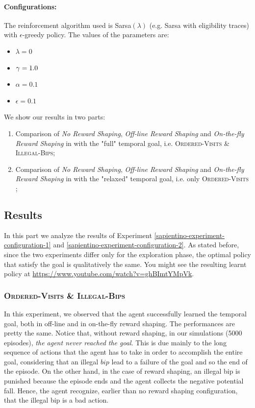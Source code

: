 \paragraph{Configurations:}
The reinforcement algorithm used is Sarsa$(\lambda)$ (e.g. Sarsa with eligibility traces) with $\epsilon$-greedy policy. The values of the parameters are:
\begin{itemize}
	\item $\lambda = 0$
	\item $\gamma=1.0$	
	\item $\alpha=0.1$
	\item $\epsilon= 0.1$
\end{itemize}

\medskip

We show our results in two parts:
\begin{enumerate}
	\item Comparison of \emph{No Reward Shaping}, \emph{Off-line Reward Shaping} and \emph{On-the-fly Reward Shaping} in \Sapientino with the "full" temporal goal, i.e. \textsc{Ordered-Visits \& Illegal-Bips}\label{sapientino-experiment-configuration-1};
	\item Comparison of \emph{No Reward Shaping}, \emph{Off-line Reward Shaping} and \emph{On-the-fly Reward Shaping} in \Sapientino with the "relaxed" temporal goal, i.e. only \textsc{Ordered-Visits} \label{sapientino-experiment-configuration-2};
\end{enumerate}

\subsection{Results}
In this part we analyze the results of Experiment \ref{sapientino-experiment-configuration-1} and \ref{sapientino-experiment-configuration-2}. As stated before, since the two experiments differ only for the exploration phase, the optimal policy that satisfy the goal is qualitatively the same. You might see the resulting learnt policy at \url{https://www.youtube.com/watch?v=ghBImtYMpVk}.

\subsubsection{\textsc{Ordered-Visits \& Illegal-Bips}}
In this experiment, we observed that the agent successfully learned the temporal goal, both in off-line and in on-the-fly reward shaping. The performances are pretty the same. Notice that, without reward shaping, in our simulations (5000 episodes), \emph{the agent never reached the goal}.
This is due mainly to the long sequence of actions that the agent has to take in order to accomplish the entire goal, considering that an illegal $bip$ lead to a failure of the goal and so the end of the episode. On the other hand, in the case of reward shaping, an illegal bip is punished because the episode ends and the agent collects the negative potential fall. Hence, the agent recognize, earlier than no reward shaping configuration, that the illegal bip is a bad action.
